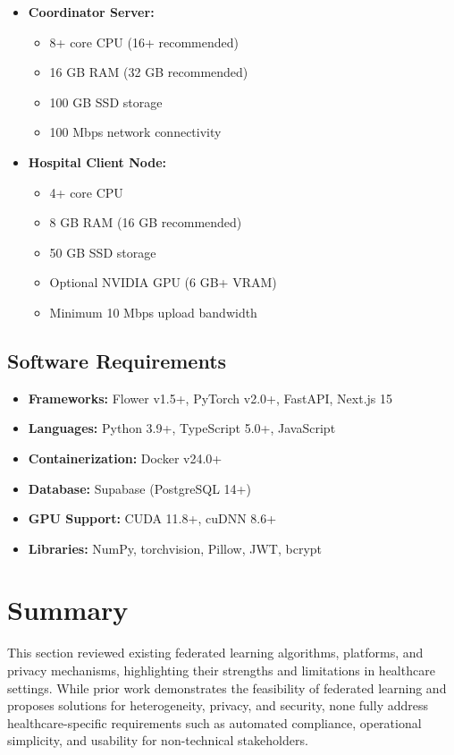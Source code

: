 \begin{itemize}
    \item \textbf{Coordinator Server:}
    \begin{itemize}
        \item 8+ core CPU (16+ recommended)
        \item 16 GB RAM (32 GB recommended)
        \item 100 GB SSD storage
        \item 100 Mbps network connectivity
    \end{itemize}
    \item \textbf{Hospital Client Node:}
    \begin{itemize}
        \item 4+ core CPU
        \item 8 GB RAM (16 GB recommended)
        \item 50 GB SSD storage
        \item Optional NVIDIA GPU (6 GB+ VRAM)
        \item Minimum 10 Mbps upload bandwidth
    \end{itemize}
\end{itemize}

\subsection{Software Requirements}

\begin{itemize}
    \item \textbf{Frameworks:} Flower v1.5+, PyTorch v2.0+, FastAPI, Next.js 15
    \item \textbf{Languages:} Python 3.9+, TypeScript 5.0+, JavaScript
    \item \textbf{Containerization:} Docker v24.0+
    \item \textbf{Database:} Supabase (PostgreSQL 14+)
    \item \textbf{GPU Support:} CUDA 11.8+, cuDNN 8.6+
    \item \textbf{Libraries:} NumPy, torchvision, Pillow, JWT, bcrypt
\end{itemize}

\section{Summary}

This section reviewed existing federated learning algorithms, platforms, and privacy mechanisms, highlighting their strengths and limitations in healthcare settings. While prior work demonstrates the feasibility of federated learning and proposes solutions for heterogeneity, privacy, and security, none fully address healthcare-specific requirements such as automated compliance, operational simplicity, and usability for non-technical stakeholders.

